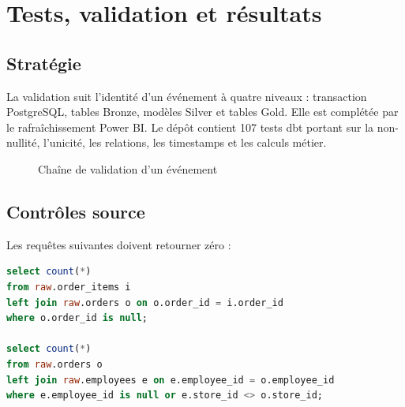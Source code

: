 \chapter{Tests, validation et résultats}

\section{Stratégie}
La validation suit l'identité d'un événement à quatre niveaux : transaction PostgreSQL, tables Bronze, modèles Silver et tables Gold. Elle est complétée par le rafraîchissement Power BI. Le dépôt contient 107 tests dbt portant sur la non-nullité, l'unicité, les relations, les timestamps et les calculs métier.

\begin{figure}[htbp]
\centering
{}
\caption{Chaîne de validation d'un événement}
\label{fig:validation-chain}
\end{figure}

\section{Contrôles source}
Les requêtes suivantes doivent retourner zéro :

\begin{lstlisting}[language=SQL,caption={Contrôles d'intégrité PostgreSQL}]
select count(*)
from raw.order_items i
left join raw.orders o on o.order_id = i.order_id
where o.order_id is null;

select count(*)
from raw.orders o
left join raw.employees e on e.employee_id = o.employee_id
where e.employee_id is null or e.store_id <> o.store_id;
\end{lstlisting}

